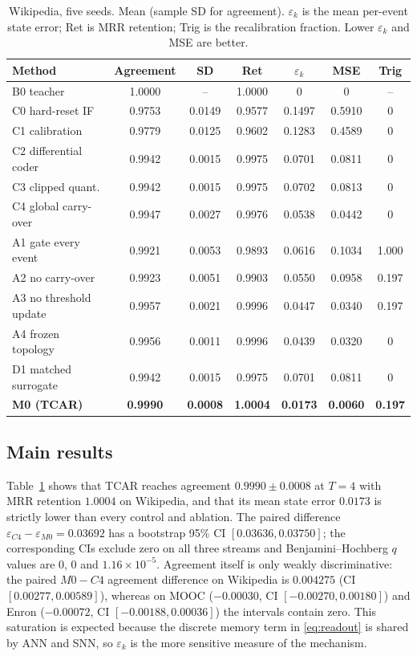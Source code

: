 \documentclass[preprint,12pt]{elsarticle}
\begin{document}
\begin{table}[t]
\centering
\caption{Wikipedia, five seeds. Mean (sample SD for agreement). $\varepsilon_k$ is the mean per-event state error; Ret is MRR retention; Trig is the recalibration fraction. Lower $\varepsilon_k$ and MSE are better.}
\label{tab:main}
\small
\begin{tabular}{lcccccc}
\toprule
Method & Agreement & SD & Ret & $\varepsilon_k$ & MSE & Trig \\
\midrule
B0 teacher & 1.0000 & -- & 1.0000 & 0 & 0 & -- \\
C0 hard-reset IF & 0.9753 & 0.0149 & 0.9577 & 0.1497 & 0.5910 & 0 \\
C1 calibration & 0.9779 & 0.0125 & 0.9602 & 0.1283 & 0.4589 & 0 \\
C2 differential coder & 0.9942 & 0.0015 & 0.9975 & 0.0701 & 0.0811 & 0 \\
C3 clipped quant. & 0.9942 & 0.0015 & 0.9975 & 0.0702 & 0.0813 & 0 \\
C4 global carry-over & 0.9947 & 0.0027 & 0.9976 & 0.0538 & 0.0442 & 0 \\
A1 gate every event & 0.9921 & 0.0053 & 0.9893 & 0.0616 & 0.1034 & 1.000 \\
A2 no carry-over & 0.9923 & 0.0051 & 0.9903 & 0.0550 & 0.0958 & 0.197 \\
A3 no threshold update & 0.9957 & 0.0021 & 0.9996 & 0.0447 & 0.0340 & 0.197 \\
A4 frozen topology & 0.9956 & 0.0011 & 0.9996 & 0.0439 & 0.0320 & 0 \\
D1 matched surrogate & 0.9942 & 0.0015 & 0.9975 & 0.0701 & 0.0811 & 0 \\
\textbf{M0 (TCAR)} & \textbf{0.9990} & \textbf{0.0008} & \textbf{1.0004} & \textbf{0.0173} & \textbf{0.0060} & \textbf{0.197} \\
\bottomrule
\end{tabular}
\end{table}

\subsection{Main results}

Table~\ref{tab:main} shows that TCAR reaches agreement $0.9990\pm0.0008$ at $T=4$ with MRR retention $1.0004$ on Wikipedia, and that its mean state error $0.0173$ is strictly lower than every control and ablation. The paired difference $\varepsilon_{C4}-\varepsilon_{M0}=0.03692$ has a bootstrap 95\% CI $[0.03636,0.03750]$; the corresponding CIs exclude zero on all three streams and Benjamini--Hochberg $q$ values are $0$, $0$ and $1.16\times10^{-5}$. Agreement itself is only weakly discriminative: the paired $M0-C4$ agreement difference on Wikipedia is $0.004275$ (CI $[0.00277,0.00589]$), whereas on MOOC ($-0.00030$, CI $[-0.00270,0.00180]$) and Enron ($-0.00072$, CI $[-0.00188,0.00036]$) the intervals contain zero. This saturation is expected because the discrete memory term in \eqref{eq:readout} is shared by ANN and SNN, so $\varepsilon_k$ is the more sensitive measure of the mechanism.
\end{document}
